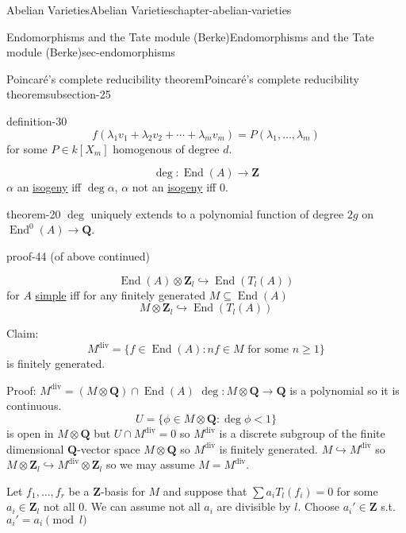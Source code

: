 \documentclass[oneside,10pt,]{book}
\numberwithin{equation}{section}
\newcommand{\lb}{[}
\newcommand{\rb}{]}
\newcommand{\ZZ}{\mathbf{Z}}
\newcommand{\QQ}{\mathbf{Q}}
\DeclareMathOperator{\End}{End}
\newcommand{\lt}{<}
\begin{document}
\begin{chapterptx}{Abelian Varieties}{}{Abelian Varieties}{}{}{chapter-abelian-varieties}
\begin{sectionptx}{Endomorphisms and the Tate module (Berke)}{}{Endomorphisms and the Tate module (Berke)}{}{}{sec-endomorphisms}
\begin{subsectionptx}{Poincaré's complete reducibility theorem}{}{Poincaré's complete reducibility theorem}{}{}{subsection-25}
\begin{definition}{}{definition-30}
\begin{equation*}
f(\lambda_1 v_1 + \lambda_2 v_2 +\cdots + \lambda_m v_m) = P(\lambda_1,\ldots, \lambda_m)
\end{equation*}
for some \(P\in k\lb X_m\rb\) homogenous of degree \(d\).%
\end{definition}
\hypertarget{p-235}{}%
%
\begin{equation*}
\deg\colon \End(A) \to \ZZ
\end{equation*}
\(\alpha\) an \hyperref[def-supersing-isog-isog]{isogeny} iff \(\deg \alpha\), \(\alpha\) not an \hyperref[def-supersing-isog-isog]{isogeny} iff \(0\).%
\begin{theorem}{}{}{theorem-20}%
\hypertarget{p-236}{}%
\(\deg\) uniquely extends to a polynomial function of degree \(2g\) on \(\End^0(A) \to \QQ\).%
\end{theorem}
\begin{proofptx}{}{proof-44}
\hypertarget{p-237}{}%
(of above continued)%
\par
\hypertarget{p-238}{}%
%
\begin{equation*}
\End(A) \otimes \ZZ_l \hookrightarrow\End(T_l(A))
\end{equation*}
for \(A\) \hyperref[def-simple-av]{simple} iff for any finitely generated \(M \subseteq \End(A)\)%
\begin{equation*}
M \otimes \ZZ_l \hookrightarrow \End(T_l(A))
\end{equation*}
%
\par
\hypertarget{p-239}{}%
Claim:%
\begin{equation*}
M^{\text{div}} = \{f\in \End(A) : nf\in M \text{ for some }n\ge 1\}
\end{equation*}
is finitely generated.%
\par
\hypertarget{p-240}{}%
Proof: \(M^\text{div} = (M\otimes \QQ) \cap \End(A)\) \(\deg \colon M \otimes \QQ \to \QQ\) is a polynomial so it is continuous.%
\begin{equation*}
U = \{\phi\in M \otimes \QQ : \deg \phi \lt 1\}
\end{equation*}
is open in \(M \otimes \QQ\) but \(U \cap M^\text{div} = 0\) so \(M^\text{div} \) is a discrete subgroup of the finite dimensional \(\QQ\)-vector space \(M \otimes \QQ\) so \(M^\text{div}\) is finitely generated. \(M \hookrightarrow M^\text{div}\) so \(M \otimes \ZZ_l \hookrightarrow M^\text{div} \otimes \ZZ_l\) so  we may assume \(M = M^\text{div}\).%
\par
\hypertarget{p-241}{}%
Let \(f_1,\ldots, f_r\) be a \(\ZZ\)-basis for \(M\) and suppose that \(\sum a_iT_l(f_i)=0\) for some \(a_i \in \ZZ_l\) not all 0. We can assume not all \(a_i\) are divisible by \(l\). Choose \(a_i' \in \ZZ\) s.t. \(a_i'=a_i \pmod{l}\)%

\end{proofptx}
\end{subsectionptx}
\end{sectionptx}
\end{chapterptx}
\end{document}
